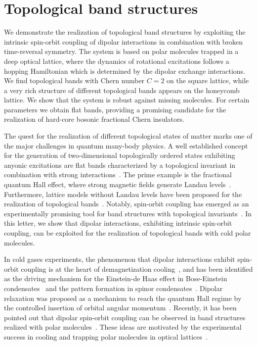 \label{topological_bands}
\chapter{Topological band structures}

We demonstrate the realization of topological band structures by exploiting the intrinsic spin-orbit coupling of dipolar interactions in combination with broken time-reversal symmetry.
The system is based on polar molecules trapped in a deep optical lattice, where the dynamics of rotational excitations follows a hopping Hamiltonian which is determined by the dipolar exchange interactions.
We find topological bands with Chern number $C=2$ on the square lattice, while a very rich structure of different topological bands appears on the honeycomb lattice.
We show that the system is robust against missing molecules.
For certain parameters we obtain flat bands, providing a promising candidate for the realization of hard-core bosonic fractional Chern insulators.

The quest for the realization of different topological states of matter marks one of the major challenges in quantum many-body physics.
A well established concept for the generation of two-dimensional topologically ordered states exhibiting anyonic excitations are flat bands characterized by a topological invariant in combination with strong interactions~\cite{Bergholtz2013,Parameswaran2013}.
The prime example is the fractional quantum Hall effect, where strong magnetic fields generate Landau levels~\cite{Nayak2008}.
Furthermore, lattice models without Landau levels have been proposed for the realization of topological bands~\cite{Haldane1988,Raghu2008,Wang2011,Neupert2011,Wang2012a,Grushin2012,Moller2009,Sun2010,Barkeshli2012,Wang2011a,Sterdyniak2013,Liu2012,Yao2013,Yang2012,Dauphin2012,Cooper2012,Cooper2013,Shi2013}.
Notably, spin-orbit coupling has emerged as an experimentally promising tool for band structures with topological invariants~\cite{Kane2005,Pesin2009,Qi2011,Hasan2010,Tang2011,Qiao2011}.
In this letter, we show that dipolar interactions, exhibiting intrinsic spin-orbit coupling, can be exploited for the realization of topological bands with cold polar molecules.

In cold gases experiments, the phenomenon that dipolar interactions exhibit spin-orbit coupling is at the heart of demagnetization cooling~\cite{Hensler2003,Fattori2006,Pasquiou2011,DePaz2013a},
and has been identified as the driving mechanism for the Einstein-de Haas effect in Bose-Einstein condensates~\cite{Kawaguchi2006} and the pattern formation in spinor condensates~\cite{Santos2006,Vengalattore2008,Kurn2013}.
Dipolar relaxation was proposed as a mechanism to reach the quantum Hall regime by the controlled insertion of orbital angular momentum~\cite{Peter2013}.
Recently, it has been pointed out that dipolar spin-orbit coupling can be observed in band structures realized with polar molecules~\cite{Syzranov2014}.
These ideas are motivated by the experimental success in cooling and trapping polar molecules in optical lattices~\cite{Ni2008b,Yan2013}.

